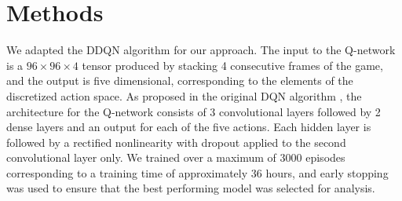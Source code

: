 \documentclass{article}
\begin{document}
\section{Methods}
We adapted the DDQN algorithm \cite{DDQN} for our approach. The input
to the Q-network is a $96\times96\times4$ tensor produced by stacking
4 consecutive frames of the game, and the output is five dimensional,
corresponding to the elements of the discretized action space. As
proposed in the original DQN algorithm \cite{DQN}, the architecture
for the Q-network consists of 3 convolutional layers followed by 2
dense layers and an output for each of the five actions. Each hidden
layer is followed by a rectified nonlinearity with dropout applied to
the second convolutional layer only. We trained over a maximum of 3000
episodes corresponding to a training time of approximately 36 hours,
and early stopping was used to ensure that the best performing model
was selected for analysis. 
\end{document}

